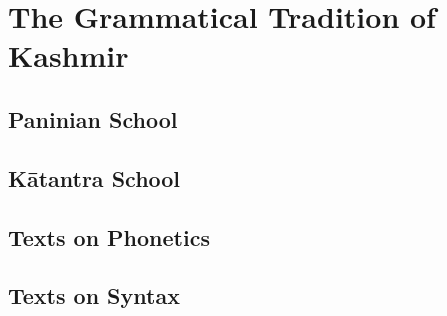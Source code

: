 \chapter{The Grammatical Tradition of Kashmir}

\section{Paninian School}

\section{Kātantra School}

\section{Texts on Phonetics}

\section{Texts on Syntax}